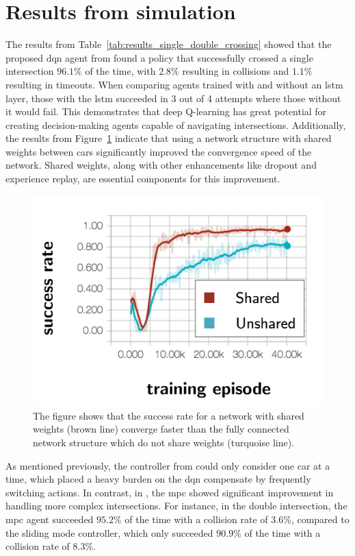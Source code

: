 \section{Results from simulation}
The results from Table~\ref{tab:results_single_double_crossing} showed that the proposed \gls{dqn} agent from \paperLSTM found a policy that successfully crossed a single intersection $96.1\%$ of the time, with $2.8\%$ resulting in collisions and $1.1\%$ resulting in timeouts. 
When comparing agents trained with and without an \gls{lstm} layer, those with the \gls{lstm} succeeded in 3 out of 4 attempts where those without it would fail.
This demonstrates that deep Q-learning has great potential for creating decision-making agents capable of navigating intersections. Additionally, the results from Figure~\ref{fig:results_shared} indicate that using a network structure with shared weights between cars significantly improved the convergence speed of the network. Shared weights, along with other enhancements like dropout and experience replay, are essential components for this improvement.

\begin{figure}[!ht]
	\centering
	\includegraphics[width=0.7\columnwidth]{YourThesis/papers/lstm/figures/results_shared.png}
	\caption{The figure shows that the success rate for a network with shared weights (brown line) converge faster than the fully connected network structure which do not share weights (turquoise line).}
	\label{fig:results_shared}
\end{figure}

As mentioned previously, the controller from \paperLSTM could only consider one car at a time, which placed a heavy burden on the \gls{dqn} compensate by frequently switching actions. 
In contrast, in \paperMPC, the \gls{mpc} showed significant improvement in handling more complex intersections.
For instance, in the double intersection, the \gls{mpc} agent succeeded $95.2\%$ of the time with a collision rate of $3.6\%$, compared to the sliding mode controller, which only succeeded $90.9\%$ of the time with a collision rate of $8.3\%$.


